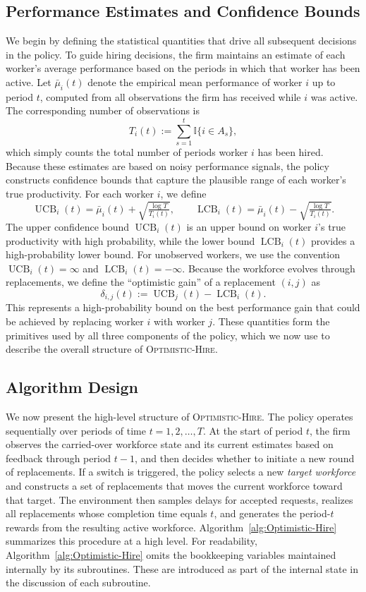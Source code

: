 \documentclass[opre,blindrev]{informs3}
\newcommand{\UCB}{\operatorname{UCB}}
\newcommand{\LCB}{\operatorname{LCB}}
\begin{document}
\subsection{Performance Estimates and Confidence Bounds}
We begin by defining the statistical quantities that drive all subsequent decisions in the policy. To guide hiring decisions, the firm maintains an estimate of each worker's average performance based on the periods in which that worker has been active. Let \(\bar{\mu}_i(t)\) denote the empirical mean performance of worker \(i\) up to period \(t\), computed from all observations the firm has received while \(i\) was active. The corresponding number of observations is
\[
    T_i(t) := \sum_{s=1}^t \mathbb{I}\{  i \in A_s  \},
\]
which simply counts the total number of periods worker \(i\) has been hired. Because these estimates are based on noisy performance signals, the policy constructs confidence bounds that capture the plausible range of each worker's true productivity. For each worker \(i\), we define
\[
    \UCB_i(t) = \bar{\mu}_i(t) + \sqrt{\tfrac{\log T}{T_i(t)}},\qquad 
    \LCB_i(t) = \bar{\mu}_i(t) - \sqrt{\tfrac{\log T}{T_i(t)}}.
\]
The upper confidence bound \(\UCB_i(t)\) is an upper bound on worker \(i\)'s true productivity with high probability, while the lower bound \(\LCB_i(t)\) provides a high-probability lower bound. For unobserved workers, we use the convention \(\UCB_i(t)=\infty\) and \(\LCB_i(t)=-\infty\). Because the workforce evolves through replacements, we define the ``optimistic gain'' of a replacement \((i,j)\) as
\[\delta_{i,j}(t):= \UCB_j(t) - \LCB_i(t).\]
This represents a high-probability bound on the best performance gain that could be achieved by replacing worker \(i\) with worker \(j\). These quantities form the primitives used by all three components of the policy, which we now use to describe the overall structure of \textsc{Optimistic-Hire}.

\vspace{-.1in}

\subsection{Algorithm Design}

We now present the high-level structure of \textsc{Optimistic-Hire}. The policy operates sequentially over periods of time \(t=1,2,\dots,T\). At the start of period \(t\), the firm observes the carried-over workforce state and its current estimates based on feedback through period \(t-1\), and then decides whether to initiate a new round of replacements. If a switch is triggered, the policy selects a new \emph{target workforce} and constructs a set of replacements that moves the current workforce toward that target. The environment then samples delays for accepted requests, realizes all replacements whose completion time equals \(t\), and generates the period-\(t\) rewards from the resulting active workforce. Algorithm~\ref{alg:Optimistic-Hire} summarizes this procedure at a high level. For readability, Algorithm~\ref{alg:Optimistic-Hire} omits the bookkeeping variables maintained internally by its subroutines. These are introduced as part of the internal state in the discussion of each subroutine. 
\end{document}
